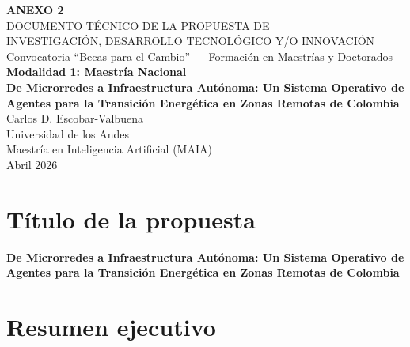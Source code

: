 \documentclass[12pt,letterpaper]{article}
\begin{document}
\begin{titlepage}
\centering
\vspace*{2cm}

{\Large\bfseries ANEXO 2}\\[0.8cm]
{\large DOCUMENTO T\'ECNICO DE LA PROPUESTA DE\\
INVESTIGACI\'ON, DESARROLLO TECNOL\'OGICO Y/O INNOVACI\'ON}\\[1.5cm]

{\normalsize Convocatoria ``Becas para el Cambio'' --- Formaci\'on en Maestr\'ias y Doctorados}\\[0.3cm]
{\normalsize \textbf{Modalidad 1: Maestr\'ia Nacional}}\\[2.5cm]

{\LARGE\bfseries De Microrredes a Infraestructura Aut\'onoma: Un Sistema Operativo de Agentes para la Transici\'on Energ\'etica en Zonas Remotas de Colombia}\\[3cm]

{\large Carlos D. Escobar-Valbuena}\\[0.5cm]
{\normalsize Universidad de los Andes}\\
{\normalsize Maestr\'ia en Inteligencia Artificial (MAIA)}\\[2cm]

{\normalsize Abril 2026}

\vfill
\end{titlepage}

\tableofcontents
\clearpage

\section{T\'itulo de la propuesta}

\textbf{De Microrredes a Infraestructura Aut\'onoma: Un Sistema Operativo de Agentes para la Transici\'on Energ\'etica en Zonas Remotas de Colombia}

\section{Resumen ejecutivo}
\end{document}
